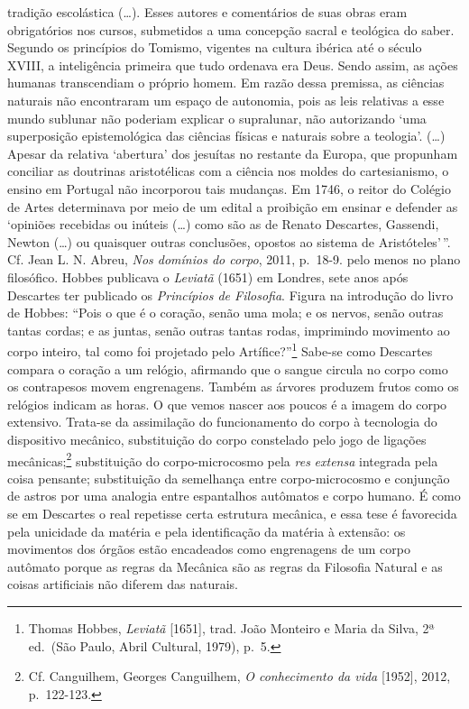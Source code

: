 {  tradição escolástica (\dots{}). Esses autores e comentários de suas obras
  eram obrigatórios nos cursos, submetidos a uma concepção sacral e
  teológica do saber. Segundo os princípios do Tomismo, vigentes na
  cultura ibérica até o século XVIII, a inteligência primeira que tudo
  ordenava era Deus. Sendo assim, as ações humanas transcendiam o
  próprio homem. Em razão dessa premissa, as ciências naturais não
  encontraram um espaço de autonomia, pois as leis relativas a esse
  mundo sublunar não poderiam explicar o supralunar, não autorizando
  `uma superposição epistemológica das ciências físicas e naturais sobre
  a teologia'. (\ldots{}) Apesar da relativa `abertura' dos jesuítas no
  restante da Europa, que propunham conciliar as doutrinas aristotélicas
  com a ciência nos moldes do cartesianismo, o ensino em Portugal não
  incorporou tais mudanças. Em 1746, o reitor do Colégio de Artes
  determinava por meio de um edital a proibição em ensinar e defender as
  `opiniões recebidas ou inúteis (\ldots{}) como são as de Renato
  Descartes, Gassendi, Newton (\ldots{}) ou quaisquer outras conclusões,
  opostos ao sistema de Aristóteles'\,''. Cf. Jean L. N. Abreu,
  \textit{Nos domínios do corpo}, 2011, p.~18-9.} pelo menos no plano
filosófico. Hobbes publicava o \textit{Leviatã} (1651) em Londres, sete
anos após Descartes ter publicado os \textit{Princípios de Filosofia}.
Figura na introdução do livro de Hobbes: ``Pois o que é o coração, senão
uma mola; e os nervos, senão outras tantas cordas; e as juntas, senão
outras tantas rodas, imprimindo movimento ao corpo inteiro, tal como foi
projetado pelo Artífice?''\footnote{Thomas Hobbes, \textit{Leviatã}
  {[}1651{]}, trad. João Monteiro e Maria da Silva, 2ª ed.~(São Paulo,
  Abril Cultural, 1979), p.~5.} Sabe-se como Descartes compara o coração
a um relógio, afirmando que o sangue circula no corpo como os
contrapesos movem engrenagens. Também as árvores produzem frutos como os
relógios indicam as horas. O que vemos nascer aos poucos é a imagem do
corpo extensivo. Trata-se da assimilação do funcionamento do corpo à
tecnologia do dispositivo mecânico, substituição do corpo constelado
pelo jogo de ligações mecânicas;\footnote{Cf. Canguilhem, Georges
  Canguilhem, \textit{O conhecimento da vida} {[}1952{]}, 2012,
  p.~122-123.} substituição do corpo-microcosmo pela \textit{res}
\textit{extensa} integrada pela coisa pensante; substituição da semelhança
entre corpo-microcosmo e conjunção de astros por uma analogia entre
espantalhos autômatos e corpo humano. É como se em Descartes o real
repetisse certa estrutura mecânica, e essa tese é favorecida pela
unicidade da matéria e pela identificação da matéria à extensão: os
movimentos dos órgãos estão encadeados como engrenagens de um corpo
autômato porque as regras da Mecânica são as regras da Filosofia Natural
e as coisas artificiais não diferem das naturais.

